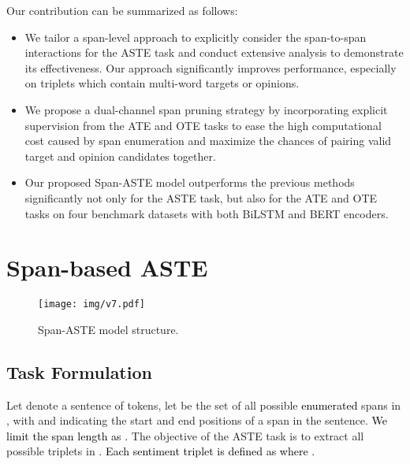 \documentclass[11pt,a4paper]{article}
\begin{document}
Our contribution can be summarized as follows: 
\begin{itemize}
\item We tailor a span-level approach to explicitly consider the span-to-span interactions for the ASTE task and conduct extensive analysis to demonstrate its effectiveness. Our approach significantly improves performance, especially on triplets which contain multi-word targets or opinions.
\item We propose a dual-channel span pruning strategy by incorporating explicit supervision from the ATE and OTE tasks to ease the high computational cost caused by span enumeration and maximize the chances of pairing valid target and opinion candidates together.
\item Our proposed Span-ASTE model outperforms the previous methods significantly not only for the ASTE task, but also for the ATE and OTE tasks on four benchmark datasets with both BiLSTM and BERT encoders.
    
\end{itemize}














\section{Span-based ASTE}

\begin{figure*}[!t]
\centering
\texttt{[image: img/v7.pdf]}
\caption{Span-ASTE model structure.}
\label{fig:model}
\end{figure*}



\subsection{{Task Formulation}}
Let  denote a sentence of  tokens, let  be the set of all possible \textcolor{black}{enumerated} spans in , with  and  indicating the start and end positions of a span in the sentence.
\textcolor{black}{We limit the span length as .}
The objective of the ASTE task is to extract all possible triplets in .
\textcolor{black}{Each sentiment triplet is defined as  where .}
\end{document}
